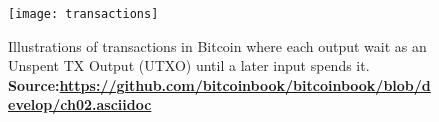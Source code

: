 \begin{figure}[!htbp]
    \centering
    \texttt{[image: transactions]}
    \caption[Illustration of transactions in Bitcoin where each output wait as an Unspent TX Output (UTXO) until a later input spends it]
    {Illustrations of transactions in Bitcoin where each output wait as an Unspent TX Output (UTXO) until a later input spends it. \\  \textbf{Source:\url{https://github.com/bitcoinbook/bitcoinbook/blob/develop/ch02.asciidoc}}
    }
    \label{fig:transaction}
\end{figure}
    